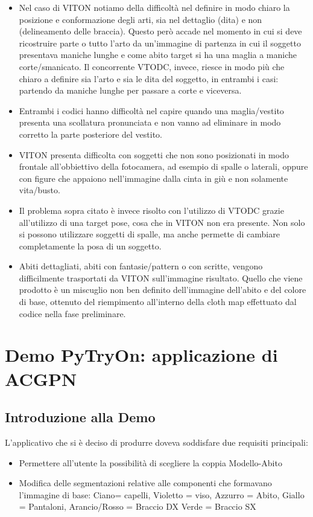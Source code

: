 \documentclass[final, 11pt]{article}
\begin{document}
	\begin{itemize}
		\item 	Nel caso di VITON notiamo della difficoltà nel definire in modo chiaro la posizione e conformazione degli arti, sia nel dettaglio (dita) e non (delineamento delle braccia). Questo però accade nel momento in cui si deve ricostruire parte o tutto l’arto da un’immagine di partenza in cui il soggetto presentava maniche lunghe e come abito target si ha una maglia a maniche corte/smanicato.
		Il concorrente VTODC, invece, riesce in modo più che chiaro a definire sia l’arto e sia le dita del soggetto, in entrambi i casi: partendo da maniche lunghe per passare a corte e viceversa.
		\item Entrambi i codici hanno difficoltà nel capire quando una maglia/vestito presenta una scollatura pronunciata e non vanno ad eliminare in modo corretto la parte posteriore del vestito.
		\item	VITON presenta difficolta con soggetti che non sono posizionati in modo frontale all’obbiettivo della fotocamera, ad esempio di spalle o laterali, oppure con figure che appaiono nell’immagine dalla cinta in giù e non solamente vita/busto. 
		\item	Il problema sopra citato è invece risolto con l’utilizzo di VTODC grazie all’utilizzo di una target pose, cosa che in VITON non era presente.
		Non solo si possono utilizzare soggetti di spalle, ma anche permette di cambiare completamente la posa di un soggetto.
		\item Abiti dettagliati, abiti con fantasie/pattern o con scritte, vengono difficilmente trasportati da VITON sull’immagine risultato. Quello che viene prodotto è un miscuglio non ben definito dell’immagine dell’abito e del colore di base, ottenuto del riempimento all’interno della cloth map effettuato dal codice nella fase preliminare.
		
	\end{itemize}
	
	
	\newpage
	\section{Demo PyTryOn: applicazione di ACGPN}
	\subsection{Introduzione alla Demo}
	L’applicativo che si è deciso di produrre doveva soddisfare due requisiti principali:
	\begin{itemize}
		\item Permettere all’utente la possibilità di scegliere la coppia Modello-Abito
		\item Modifica delle segmentazioni relative alle componenti che formavano l’immagine di base:
		Ciano= capelli, Violetto = viso, Azzurro = Abito, Giallo = Pantaloni, Arancio/Rosso = Braccio DX
		Verde = Braccio SX
	\end{itemize}
\end{document}
